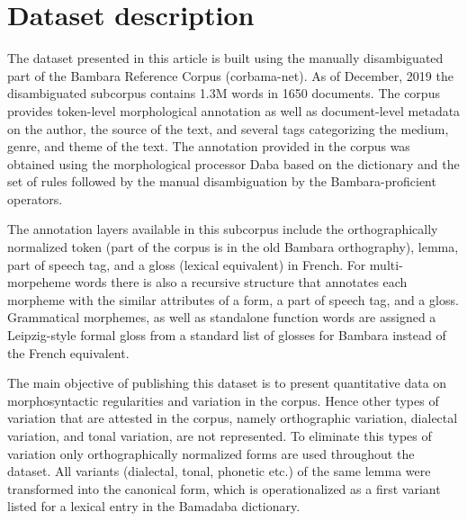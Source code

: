 \documentclass[12pt]{article}
\begin{document}


\section{Dataset description}
\label{sec:data}

The dataset presented in this article is built using the manually
disambiguated part of the Bambara Reference Corpus
(corbama-net). As of December, 2019 the
disambiguated subcorpus contains 1.3M words in 1650 documents. The
corpus provides token-level morphological annotation as well as
document-level metadata on the author, the source of the text, and
several tags categorizing the medium, genre, and theme of the
text. The annotation provided in the
corpus was obtained using the morphological processor Daba based on
the dictionary and the set of rules followed by the
manual disambiguation by the Bambara-proficient
operators.

The annotation layers available in this subcorpus include the
orthographically normalized token (part of the corpus is in the
old Bambara orthography), lemma, part of speech
tag, and a gloss (lexical equivalent) in French. For multi-morpeheme
words there is also a recursive structure that annotates each morpheme
with the similar attributes of a form, a part of speech tag, and a
gloss. Grammatical morphemes, as well as standalone function words are
assigned a Leipzig-style formal gloss from a standard list of glosses
for Bambara instead of the French equivalent.

The main objective of publishing this dataset is to present
quantitative data on morphosyntactic regularities and variation in the
corpus. Hence other types of variation that are attested in the
corpus, namely orthographic variation, dialectal variation, and tonal
variation, are not represented. To eliminate this types of variation
only orthographically normalized forms are used throughout the
dataset. All variants (dialectal, tonal, phonetic etc.) of the same
lemma were transformed into the canonical form, which is
operationalized as a first variant listed for a lexical entry in the
Bamadaba dictionary.  
\end{document}
